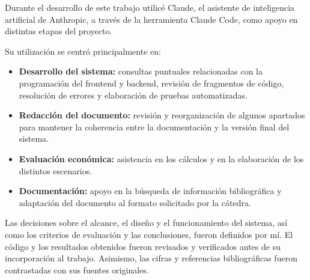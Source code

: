
Durante el desarrollo de este trabajo utilicé Claude, el asistente de inteligencia artificial de Anthropic, a través de la herramienta Claude Code, como apoyo en distintas etapas del proyecto.

Su utilización se centró principalmente en:

\begin{itemize}
    \item \textbf{Desarrollo del sistema:} consultas puntuales relacionadas con la programación del frontend y backend, revisión de fragmentos de código, resolución de errores y elaboración de pruebas automatizadas.
    \item \textbf{Redacción del documento:} revisión y reorganización de algunos apartados para mantener la coherencia entre la documentación y la versión final del sistema.
    \item \textbf{Evaluación económica:} asistencia en los cálculos y en la elaboración de los distintos escenarios.
    \item \textbf{Documentación:} apoyo en la búsqueda de información bibliográfica y adaptación del documento al formato solicitado por la cátedra.
\end{itemize}

Las decisiones sobre el alcance, el diseño y el funcionamiento del sistema, así como los criterios de evaluación y las conclusiones, fueron definidos por mí. El código y los resultados obtenidos fueron revisados y verificados antes de su incorporación al trabajo. Asimismo, las cifras y referencias bibliográficas fueron contrastadas con sus fuentes originales.
